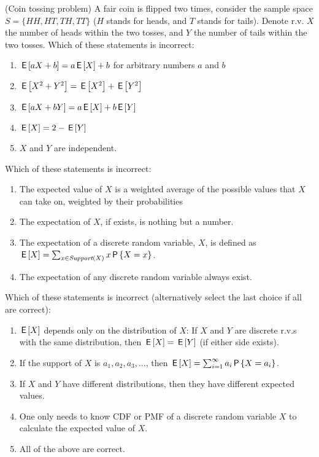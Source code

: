 \documentclass[poll_tutorial_format]{subfiles}
\begin{document}
	
		
	\begin{exercise}
		(Coin tossing problem) A fair coin is flipped two times, consider the sample space $S=\{HH, HT, TH, TT\}$ ($H$ stands for heads, and $T$ stands for tails). Denote r.v. $X$ the number of heads within the two tosses, and $Y$ the number of tails within the two tosses.
		Which of these statements is incorrect: 
		\begin{enumerate}
			\item $\,\mathsf{E}\left[aX+b\right]=a\,\mathsf{E}\left[X\right]+b$ for arbitrary numbers $a$ and $b$ 
			\item $\,\mathsf{E}\left[X^2 +Y^2\right]=\,\mathsf{E}\left[X^2\right] +\,\mathsf{E}\left[Y^2\right]$
			\item $\,\mathsf{E}\left[aX+bY\right]=a\,\mathsf{E}\left[X\right] +b\,\mathsf{E}\left[Y\right]$
			\item $\,\mathsf{E}\left[X\right]=2-\,\mathsf{E}\left[Y\right]$ 		
			\item $X$ and $Y$ are independent.
		\end{enumerate}
	\end{exercise}
	
	
	\begin{exercise}
	Which of these statements is incorrect: 
		\begin{enumerate}
			\item The expected value of $X$ is a weighted average of the possible values that $X$ can take on, weighted by their probabilities
			\item The expectation of $X$, if exists, is nothing but a number.
			\item  The expectation of a discrete random variable, $X$, is defined as $\,\mathsf{E}\left[X\right]=\sum_{x\in \textit{Support}(X)} x\,\mathsf{P}\left\{X=x\right\}$.
			\item The expectation of any discrete random variable always exist.  
		\end{enumerate}
	\end{exercise}
	
	
	
	\begin{exercise}
		Which of these statements is incorrect (alternatively select the last choice if all are correct):
		\begin{enumerate}
			\item $\,\mathsf{E}\left[X\right]$ depends only on the distribution of $X$: If $X$ and $Y$ are discrete r.v.s with the same distribution, then $\,\mathsf{E}\left[X\right] = \,\mathsf{E}\left[Y\right]$ (if either side exists).
			\item If the support of $X$ is $a_1, a_2, a_3, \dots$, then $\,\mathsf{E}\left[X\right]=\sum_{i=1}^\infty a_i \,\mathsf{P}\left\{X=a_i\right\}$.
			\item If $X$ and $Y$ have different distributions, then they have different expected values. 
			\item One only needs to know CDF or PMF of a discrete random variable $X$ to calculate the expected value of $X$.
			\item All of the above are correct. 
		\end{enumerate}
	\end{exercise}
	
\end{document}
